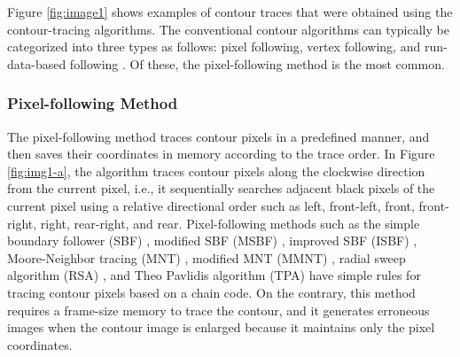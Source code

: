 Figure \ref{fig:image1} shows examples of contour traces that were obtained using the contour-tracing algorithms. The conventional contour algorithms can typically be categorized into three types as follows: pixel following, vertex following, and run-data-based following \cite{Miyatake1997Contour,Danielsson1981Improvement,Shoji1999Contour}. Of these, the pixel-following method is the most common.

\subsubsection{Pixel-following Method}


The pixel-following method traces contour pixels in a predefined manner, and then saves their coordinates in memory according to the trace order. In Figure \ref{fig:img1-a}, the algorithm traces contour pixels along the clockwise direction from the current pixel, i.e., it sequentially searches adjacent black pixels of the current pixel using a relative directional order such as left, front-left, front, front-right, right, rear-right, and rear. Pixel-following methods such as the simple boundary follower (SBF) \cite{Pitas2000Digital,Das1990Bivariate,Papert1973Uses}, modified SBF (MSBF) \cite{Gose1996Pattern}, improved SBF (ISBF) \cite{Cheong2006Improved}, Moore-Neighbor tracing (MNT) \cite{Toussaint????Grids}, modified MNT (MMNT) \cite{Pradhan2010Contour}, radial sweep algorithm (RSA) \cite{Mirante1982Radial}, and Theo Pavlidis algorithm (TPA) \cite{Pavlidis2012Algorithms} have simple rules for tracing contour pixels based on a chain code. On the contrary, this method requires a frame-size memory to trace the contour, and it generates erroneous images when the contour image is enlarged \cite{Miyatake1997Contour} because it maintains only the pixel coordinates.

